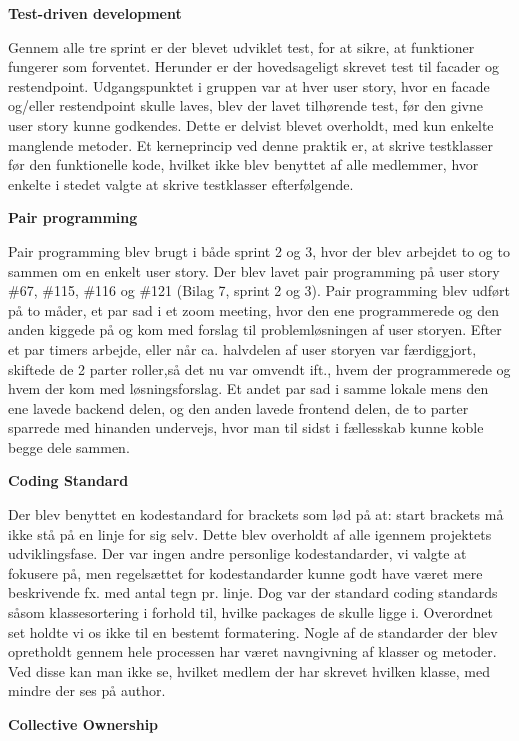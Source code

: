 \documentclass[11pt]{report}
\begin{document}
\noindent\textbf{Test-driven development}

Gennem alle tre sprint er der blevet udviklet test, for at sikre, at funktioner fungerer som forventet. Herunder er der hovedsageligt skrevet test til facader og restendpoint. Udgangspunktet i gruppen var at hver user story, hvor en facade og/eller restendpoint skulle laves, blev der lavet tilhørende test, før den givne user story kunne godkendes. Dette er delvist blevet overholdt, med kun enkelte manglende metoder. Et kerneprincip ved denne praktik er, at skrive testklasser før den funktionelle kode, hvilket ikke blev benyttet af alle medlemmer, hvor enkelte i stedet valgte at skrive testklasser efterfølgende.

\noindent\textbf{Pair programming}

Pair programming blev brugt i både sprint 2 og 3, hvor der blev arbejdet to og to sammen om en enkelt user story. Der blev lavet pair programming på user story \#67, \#115, \#116 og \#121 (Bilag 7, sprint 2 og 3). Pair programming blev udført på to måder, et par sad i et zoom meeting, hvor den ene programmerede og den anden kiggede på og kom med forslag til problemløsningen af user storyen. Efter et par timers arbejde, eller når ca. halvdelen af user storyen var færdiggjort, skiftede de 2 parter roller,så det nu var omvendt ift., hvem der programmerede og hvem der kom med løsningsforslag. Et andet par sad i samme lokale mens den ene lavede backend delen, og den anden lavede frontend delen, de to parter sparrede med hinanden undervejs, hvor man til sidst i fællesskab kunne koble begge dele sammen.

\noindent\textbf{Coding Standard}

Der blev benyttet en kodestandard for brackets som lød på at: start brackets må ikke stå på en linje for sig selv. Dette blev overholdt af alle igennem projektets udviklingsfase. Der var ingen andre personlige kodestandarder, vi valgte at fokusere på, men regelsættet for kodestandarder kunne godt have været mere beskrivende fx. med antal tegn pr. linje. Dog var der standard coding standards såsom klassesortering i forhold til, hvilke packages de skulle ligge i. Overordnet set holdte vi os ikke til en bestemt formatering. Nogle af de standarder der blev opretholdt gennem hele processen har været navngivning af klasser og metoder. Ved disse kan man ikke se, hvilket medlem der har skrevet hvilken klasse, med mindre der ses på author.

\noindent\textbf{Collective Ownership}
\end{document}
